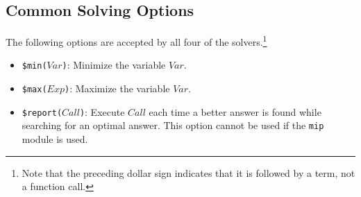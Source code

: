 \subsection{Common Solving Options}
The following options are accepted by all four of the solvers.\footnote{Note that the preceding dollar sign indicates that it is followed by a term, not a function call.}
\begin{itemize}
\item \texttt{\$min($Var$)}: Minimize the variable $Var$.
\item \texttt{\$max($Exp$)}: Maximize the variable $Var$.
\item \texttt{\$report($Call$)}: Execute $Call$ each time a better answer is found while searching for an optimal answer. This option cannot be used if the {\tt mip} module is used.
\end{itemize}

